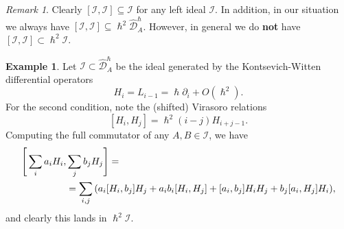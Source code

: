 \documentclass{amsart}
\theoremstyle{definition}
\newtheorem{exm}[thm]{Example}
\theoremstyle{remark}
\newtheorem{rmk}[thm]{Remark}
\theoremstyle{plain}
\theoremstyle{definition}
\theoremstyle{remark}
\newcommand{\mc}[1]{\mathcal{#1}}
\newcommand{\wh}[1]{\widehat{#1}}
\newcommand{\1}{\mathbf{1}}
\newcommand{\2}{\mathbf{2}}
\newcommand{\3}{\mathbf{3}}
\begin{document}
\begin{rmk}
    Clearly $[\mc{I}, \mc{I}] \subseteq \mc{I}$ for any left ideal $\mc{I}$. In addition, in our situation we always have $[\mc{I}, \mc{I}] \subseteq \hslash^2 \wh{\mc{D}}_A^{\hslash}$. However, in general we do \textbf{not} have $[\mc{I}, \mc{I}] \subset \hslash^2 \mc{I}$.
\end{rmk}

\begin{exm}
    Let $\mc{I} \subset \wh{\mc{D}}_A^{\hslash}$ be the ideal generated by the Kontsevich-Witten differential operators
    \[ H_i = L_{i-1} = \hslash \partial_i + O(\hslash^2). \]
    For the second condition, note the (shifted) Virasoro relations
    \[ [H_i, H_j] = \hslash^2 (i-j) H_{i+j-1}. \]
    Computing the full commutator of any $A, B \in \mc{I}$, we have
    \begin{align*}
        \Bigg[\sum_i a_i H_i, &\sum_j b_j H_j\Bigg] = \\
        &= \sum_{i,j} \qty(a_i [H_i, b_j] H_j + a_i b_i [H_i, H_j] + [a_i, b_j]H_i H_j + b_j [a_i, H_j] H_i), 
    \end{align*}
    and clearly this lands in $\hslash^2 \mc{I}$.
\end{exm}
\end{document}
